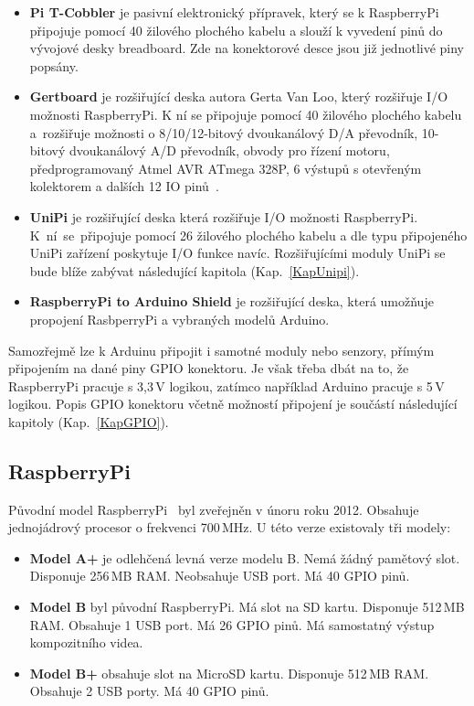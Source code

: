 \begin{itemize}
	\item \textbf{Pi T-Cobbler} je pasivní elektronický přípravek, který se k RaspberryPi připojuje pomocí 40 žilového plochého kabelu a slouží k vyvedení pinů do vývojové desky breadboard. Zde na konektorové desce jsou již jednotlivé piny popsány.
\item \textbf{Gertboard} je rozšiřující deska autora Gerta Van Loo, který rozšiřuje I/O možnosti RaspberryPi. K ní se připojuje pomocí 40 žilového plochého kabelu a~rozšiřuje možnosti o 8/10/12-bitový dvoukanálový D/A převodník, 10-bitový dvoukanálový A/D převodník, obvody pro řízení motoru, předprogramovaný Atmel AVR ATmega 328P, 6 výstupů s otevřeným kolektorem a dalších 12 IO pinů~\cite{GertBoard}.  
\item \textbf{UniPi} je rozšiřující deska která rozšiřuje I/O možnosti RaspberryPi. K~ní~se~připojuje pomocí 26 žilového plochého kabelu a dle typu připojeného UniPi zařízení poskytuje I/O funkce navíc. Rozšiřujícími moduly UniPi se bude blíže zabývat následující kapitola (Kap.~\ref{KapUnipi}).
\item \textbf{RaspberryPi to Arduino Shield} je rozšiřující deska, která umožňuje propojení RasbperryPi a vybraných modelů Arduino.
\end{itemize}
Samozřejmě lze k Arduinu připojit i samotné moduly nebo senzory, přímým připojením na dané piny GPIO konektoru. Je však třeba dbát na to, že RaspberryPi pracuje s 3,3\,V logikou, zatímco například Arduino pracuje s 5\,V logikou. Popis GPIO konektoru včetně možností připojení je součástí následující kapitoly (Kap.~\ref{KapGPIO}).

	\subsection{RaspberryPi}
	Původní model RaspberryPi~\cite{RaspiOne} byl zveřejněn v únoru roku 2012. Obsahuje jednojádrový procesor o frekvenci 700\,MHz. U této verze existovaly tři modely:
	
		\begin{itemize}
		\item \textbf{Model A+} je odlehčená levná verze modelu B. Nemá žádný pamětový slot. Disponuje 256\,MB RAM. Neobsahuje USB port. Má 40 GPIO pinů.
		\item \textbf{Model B} byl původní RaspberryPi. Má slot na SD kartu. Disponuje 512\,MB RAM. Obsahuje 1 USB port. Má 26 GPIO pinů. Má samostatný výstup kompozitního videa.
		\item \textbf{Model B+} obsahuje slot na MicroSD kartu. Disponuje 512\,MB RAM. Obsahuje 2 USB porty. Má 40 GPIO pinů.
	\end{itemize}
	
